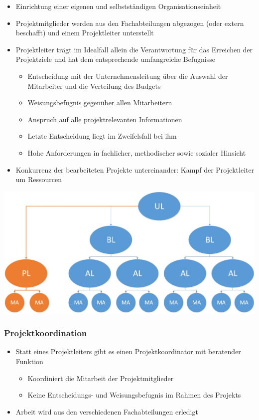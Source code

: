 \begin{itemize}
	\item Einrichtung einer eigenen und selbstständigen Organisationseinheit
	\item Projektmitglieder werden aus den Fachabteilungen abgezogen (oder extern beschafft) und einem Projektleiter unterstellt
	\item Projektleiter trägt im Idealfall allein die Verantwortung für das Erreichen der Projektziele und hat dem entsprechende umfangreiche Befugnisse
	\begin{itemize}
		\item Entscheidung mit der Unternehmensleitung über die Auswahl der Mitarbeiter und die Verteilung des Budgets
		\item Weisungsbefugnis gegenüber allen Mitarbeitern
		\item Anspruch auf alle projektrelevanten Informationen
		\item Letzte Entscheidung liegt im Zweifelsfall bei ihm
		\item Hohe Anforderungen in fachlicher, methodischer sowie sozialer Hinsicht
	\end{itemize}
	\item Konkurrenz der bearbeiteten Projekte untereinander: \ql Kampf der Projektleiter um Ressourcen\qr\
\end{itemize}

\includegraphics[scale=0.3]{pictures/lf02-pic/lf02-reine-projektorganisation.jpg}

\subsubsection{Projektkoordination}
\begin{itemize}
	\item Statt eines Projektleiters gibt es einen Projektkoordinator mit beratender Funktion
	\begin{itemize}
		\item Koordiniert die Mitarbeit der Projektmitglieder
		\item Keine Entscheidungs- und Weisungsbefugnis im Rahmen des Projekts
	\end{itemize}
	\item Arbeit wird aus den verschiedenen Fachabteilungen erledigt
\end{itemize}

